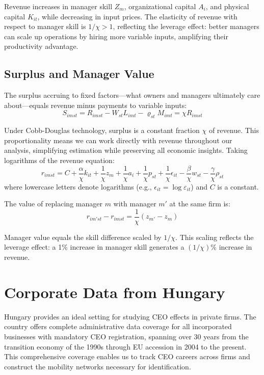 \documentclass[11pt,a4paper]{article}
\begin{document}
Revenue increases in manager skill $Z_m$, organizational capital $A_i$, and physical capital $K_{it}$, while decreasing in input prices. The elasticity of revenue with respect to manager skill is $1/\chi > 1$, reflecting the leverage effect: better managers can scale up operations by hiring more variable inputs, amplifying their productivity advantage.

\subsection{Surplus and Manager Value}

The surplus accruing to fixed factors—what owners and managers ultimately care about—equals revenue minus payments to variable inputs:
\begin{equation}\label{eq:surplus}
S_{imst} = R_{imst} - W_{st}L_{imt} - \varrho_{st}M_{imt} = \chi R_{imst}
\end{equation}

Under Cobb-Douglas technology, surplus is a constant fraction $\chi$ of revenue. This proportionality means we can work directly with revenue throughout our analysis, simplifying estimation while preserving all economic insights. Taking logarithms of the revenue equation:
\begin{equation}\label{eq:log_revenue}
r_{imst} = C+\frac{\alpha}{\chi} k_{it} + \frac{1}{\chi} z_{m} + \frac{1}{\chi} a_i + \frac{1}{\chi} p_{st} + \frac{1}{\chi}\epsilon_{it} 
- \frac{\beta}{\chi} w_{st} - \frac{\gamma}{\chi} \rho_{st}
\end{equation}
where lowercase letters denote logarithms (e.g., $\epsilon_{it} = \log \varepsilon_{it}$) and $C$ is a constant.

The value of replacing manager $m$ with manager $m'$ at the same firm is:
\begin{equation}\label{eq:manager_value}
r_{im'st} - r_{imst} = \frac{1}{\chi}(z_{m'} - z_{m})
\end{equation}

Manager value equals the skill difference scaled by $1/\chi$. This scaling reflects the leverage effect: a 1\% increase in manager skill generates a $(1/\chi)\%$ increase in revenue.

\section{Corporate Data from Hungary}

Hungary provides an ideal setting for studying CEO effects in private firms. The country offers complete administrative data coverage for all incorporated businesses with mandatory CEO registration, spanning over 30 years from the transition economy of the 1990s through EU accession in 2004 to the present. This comprehensive coverage enables us to track CEO careers across firms and construct the mobility networks necessary for identification.
\end{document}
